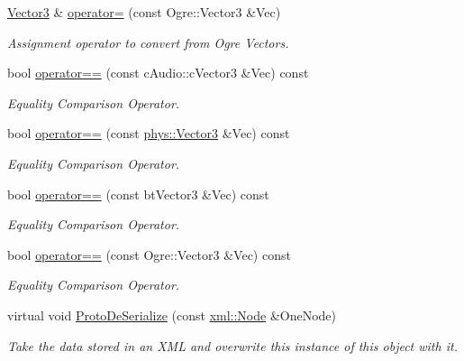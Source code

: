 \begin{DoxyCompactItemize}
\hyperlink{classphys_1_1Vector3}{Vector3} \& \hyperlink{classphys_1_1Vector3_a666d681f28de675cb45c4772a7d4a3ad}{operator=} (const Ogre::Vector3 \&Vec)
\begin{DoxyCompactList}\small\item\em Assignment operator to convert from Ogre Vectors. \item\end{DoxyCompactList}\item 
bool \hyperlink{classphys_1_1Vector3_a858a1ade83b947158eb438dae123b062}{operator==} (const cAudio::cVector3 \&Vec) const 
\begin{DoxyCompactList}\small\item\em Equality Comparison Operator. \item\end{DoxyCompactList}\item 
bool \hyperlink{classphys_1_1Vector3_a009087c59c69f69be76ba84ad90b1468}{operator==} (const \hyperlink{classphys_1_1Vector3}{phys::Vector3} \&Vec) const 
\begin{DoxyCompactList}\small\item\em Equality Comparison Operator. \item\end{DoxyCompactList}\item 
bool \hyperlink{classphys_1_1Vector3_a87076a2c336aedef5642ff1cc9fe0cad}{operator==} (const btVector3 \&Vec) const 
\begin{DoxyCompactList}\small\item\em Equality Comparison Operator. \item\end{DoxyCompactList}\item 
bool \hyperlink{classphys_1_1Vector3_aeabe5d949276abe8ea00c8b22b4e652c}{operator==} (const Ogre::Vector3 \&Vec) const 
\begin{DoxyCompactList}\small\item\em Equality Comparison Operator. \item\end{DoxyCompactList}\item 
virtual void \hyperlink{classphys_1_1Vector3_a2b1f6cb180e84747d34092cb5aeeb14b}{ProtoDeSerialize} (const \hyperlink{classphys_1_1xml_1_1Node}{xml::Node} \&OneNode)
\begin{DoxyCompactList}\small\item\em Take the data stored in an XML and overwrite this instance of this object with it. \item\end{DoxyCompactList}\item 

\end{DoxyCompactItemize}
